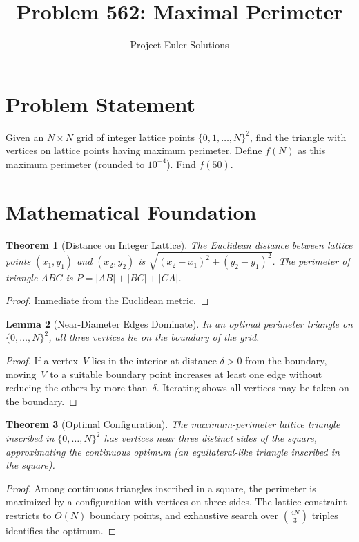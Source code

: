 \documentclass[11pt]{article}
\title{Problem 562: Maximal Perimeter}
\author{Project Euler Solutions}
\date{}
\newtheorem{theorem}{Theorem}
\newtheorem{lemma}[theorem]{Lemma}
\begin{document}
\maketitle

\section{Problem Statement}

Given an $N \times N$ grid of integer lattice points $\{0,1,\ldots,N\}^2$, find the triangle with vertices on lattice points having maximum perimeter. Define $f(N)$ as this maximum perimeter (rounded to $10^{-4}$). Find $f(50)$.

\section{Mathematical Foundation}

\begin{theorem}[Distance on Integer Lattice]
The Euclidean distance between lattice points $(x_1,y_1)$ and $(x_2,y_2)$ is $\sqrt{(x_2-x_1)^2+(y_2-y_1)^2}$. The perimeter of triangle $ABC$ is $P = |AB|+|BC|+|CA|$.
\end{theorem}

\begin{proof}
Immediate from the Euclidean metric.
\end{proof}

\begin{lemma}[Near-Diameter Edges Dominate]
In an optimal perimeter triangle on $\{0,\ldots,N\}^2$, all three vertices lie on the boundary of the grid.
\end{lemma}

\begin{proof}
If a vertex~$V$ lies in the interior at distance $\delta > 0$ from the boundary, moving~$V$ to a suitable boundary point increases at least one edge without reducing the others by more than~$\delta$. Iterating shows all vertices may be taken on the boundary.
\end{proof}

\begin{theorem}[Optimal Configuration]
The maximum-perimeter lattice triangle inscribed in $\{0,\ldots,N\}^2$ has vertices near three distinct sides of the square, approximating the continuous optimum (an equilateral-like triangle inscribed in the square).
\end{theorem}

\begin{proof}
Among continuous triangles inscribed in a square, the perimeter is maximized by a configuration with vertices on three sides. The lattice constraint restricts to $O(N)$ boundary points, and exhaustive search over $\binom{4N}{3}$ triples identifies the optimum.
\end{proof}
\end{document}
